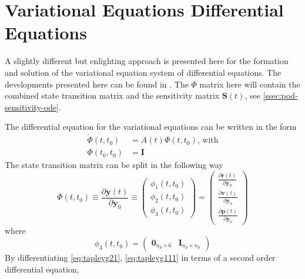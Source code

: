 \section{Variational Equations Differential Equations}\label{sec:alternate-variational-equations}

A slightly different but enlighting approach is presented here for the formation 
and solution of the variational equation system of differential equations. The 
developments presented here can be found in \cite{Tapley2004}. The $\Phi$ matrix 
here will contain the combined state transition matrix and the sensitivity 
matrix $\bm{S}(t)$, see \autoref{ssec:pod-sensitivity-ode}.

The differential equation for the variational equations can be written in the 
form
\begin{align}
  \dot{\Phi}(t, t_0) &= A(t) \Phi (t,t_0) \text{, with} \label{eq:tapleyg111}\\
  \Phi (t_0, t_0) &= \bm{I} \label{eq:tapleyg112}
\end{align}
The state transition matrix can be split in the following way
\begin{equation}\label{eq:tapleyg21}
   \Phi (t,t_0) \equiv \frac{\partial \bm{y}(t)}{\partial \bm{y}_0} \equiv 
    \begin{pmatrix}
      \phi _1 (t,t_0) \\ \phi _2 (t,t_0) \\ \phi _3 (t,t_0) \end{pmatrix}
    = \begin{pmatrix}
      \frac{\partial \bm{r}(t)}{\partial \bm{y}_0} \\
      \frac{\partial \bm{v}(t)}{\partial \bm{y}_0} \\
      \frac{\partial \bm{p}(t)}{\partial \bm{y}_0} \end{pmatrix}
\end{equation}
where 
\begin{equation}
  \phi _3 (t,t_0) = \begin{pmatrix} \bm{0}_{n_p \times 6} & \bm{I}_{n_p \times n_p} \end{pmatrix}
\end{equation}
By differentiating \autoref{eq:tapleyg21}, \autoref{eq:tapleyg111} in terms of a 
second order differential equation,
